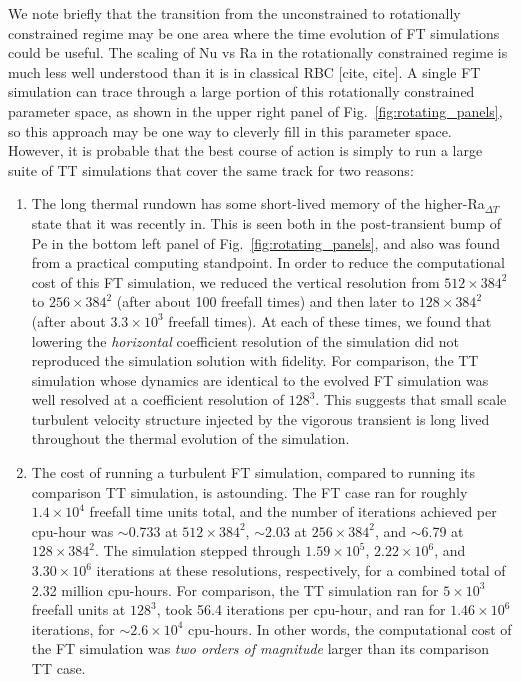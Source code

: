 \documentclass[aps, pre, onecolumn, nofootinbib, notitlepage, groupedaddress, amsfonts, amssymb, amsmath, longbibliography, superscriptaddress]{revtex4-1}
\begin{document}
We note briefly that the transition from the unconstrained to rotationally constrained regime may be one area where the time evolution of FT simulations could be useful.
The scaling of Nu vs Ra in the rotationally constrained regime is much less well understood than it is in classical RBC [cite, cite].
A single FT simulation can trace through a large portion of this rotationally constrained parameter space, as shown in the upper right panel of Fig.~\ref{fig:rotating_panels}, so this approach may be one way to cleverly fill in this parameter space.
However, it is probable that the best course of action is simply to run a large suite of TT simulations that cover the same track for two reasons:
\begin{enumerate}
\item The long thermal rundown has some short-lived memory of the higher-Ra$_{\Delta T}$ state that it was recently in.
This is seen both in the post-transient bump of Pe in the bottom left panel of Fig.~\ref{fig:rotating_panels}, and also was found from a practical computing standpoint.
In order to reduce the computational cost of this FT simulation, we reduced the vertical resolution from $512\times384^2$ to $256\times384^2$ (after about 100 freefall times) and then later to $128\times384^2$ (after about $3.3 \times 10^3$ freefall times).
At each of these times, we found that lowering the \emph{horizontal} coefficient resolution of the simulation did not reproduced the simulation solution with fidelity.
For comparison, the TT simulation whose dynamics are identical to the evolved FT simulation was well resolved at a coefficient resolution of $128^3$.
This suggests that small scale turbulent velocity structure injected by the vigorous transient is long lived throughout the thermal evolution of the simulation.
\item The cost of running a turbulent FT simulation, compared to running its comparison TT simulation, is astounding.
The FT case ran for roughly $1.4 \times 10^4$ freefall time units total, and the number of iterations achieved per cpu-hour was $\sim$0.733 at $512\times384^2$, $\sim$2.03 at $256\times384^2$, and $\sim$6.79 at $128\times384^2$.
The simulation stepped through $1.59 \times 10^5$, $2.22 \times 10^6$, and $3.30 \times 10^6$ iterations at these resolutions, respectively, for a combined total of 2.32 million cpu-hours.
For comparison, the TT simulation ran for $5 \times 10^3$ freefall units at $128^3$, took 56.4 iterations per cpu-hour, and ran for $1.46 \times 10^6$ iterations, for $\sim 2.6 \times 10^4$ cpu-hours.
In other words, the computational cost of the FT simulation was \emph{two orders of magnitude} larger than its comparison TT case.
\end{enumerate}
\end{document}

